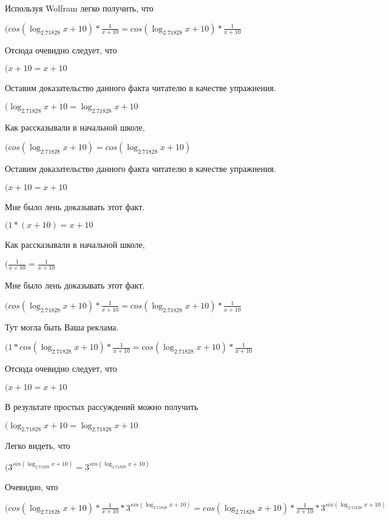 \documentclass[12pt,a4paper,fleqn]{article}
\theoremstyle{definition}
\begin{document}
Используя Wolfram легко получить, что

$(cos(\log_{ 2.71828 }{ x  +  10 }) * \frac{ 1 }{ x  +  10 }
 = cos(\log_{ 2.71828 }{ x  +  10 }) * \frac{ 1 }{ x  +  10 }
$

Отсюда очевидно следует, что

$( x  +  10  =  x  +  10 $

Оставим доказательство данного факта читателю в качестве упражнения.

$(\log_{ 2.71828 }{ x  +  10 } = \log_{ 2.71828 }{ x  +  10 }$

Как рассказывали в начальной школе,

$(cos(\log_{ 2.71828 }{ x  +  10 }) = cos(\log_{ 2.71828 }{ x  +  10 })$

Оставим доказательство данного факта читателю в качестве упражнения.

$( x  +  10  =  x  +  10 $

Мне было лень доказывать этот факт.

$( 1  * ( x  +  10 ) =  x  +  10 $

Как рассказывали в начальной школе,

$(\frac{ 1 }{ x  +  10 }
 = \frac{ 1 }{ x  +  10 }
$

Мне было лень доказывать этот факт.

$(cos(\log_{ 2.71828 }{ x  +  10 }) * \frac{ 1 }{ x  +  10 }
 = cos(\log_{ 2.71828 }{ x  +  10 }) * \frac{ 1 }{ x  +  10 }
$

Тут могла быть Ваша реклама.

$( 1  * cos(\log_{ 2.71828 }{ x  +  10 }) * \frac{ 1 }{ x  +  10 }
 = cos(\log_{ 2.71828 }{ x  +  10 }) * \frac{ 1 }{ x  +  10 }
$

Отсюда очевидно следует, что

$( x  +  10  =  x  +  10 $

В результате простых рассуждений можно получить

$(\log_{ 2.71828 }{ x  +  10 } = \log_{ 2.71828 }{ x  +  10 }$

Легко видеть, что

$({ 3 }^{sin(\log_{ 2.71828 }{ x  +  10 })} = { 3 }^{sin(\log_{ 2.71828 }{ x  +  10 })}$

Очевидно, что

$(cos(\log_{ 2.71828 }{ x  +  10 }) * \frac{ 1 }{ x  +  10 }
 * { 3 }^{sin(\log_{ 2.71828 }{ x  +  10 })} = cos(\log_{ 2.71828 }{ x  +  10 }) * \frac{ 1 }{ x  +  10 }
 * { 3 }^{sin(\log_{ 2.71828 }{ x  +  10 })}$
\end{document}
